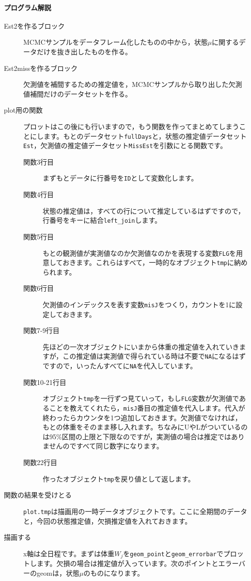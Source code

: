 \documentclass{ltjsbook}
\begin{document}
\paragraph{プログラム解説}
\begin{description}
	\item[Est2を作るブロック] MCMCサンプルをデータフレーム化したものの中から，状態$\mu$に関するデータだけを抜き出したものを作る。
	\item[Est2missを作るブロック] 欠測値を補間するための推定値を，MCMCサンプルから取り出した欠測値補間だけのデータセットを作る。
	\item[plot用の関数] プロットはこの後にも行いますので，もう関数を作ってまとめてしまうことにします。もとのデータセット\verb|fullDays|と，状態の推定値データセット\verb|Est|，欠測値の推定値データセット\verb|MissEst|を引数にとる関数です。
	      \begin{description}
		      \item[関数3行目] まずもとデータに行番号を\verb|ID|として変数化します。
		      \item[関数4行目] 状態の推定値は，すべての行について推定しているはずですので，行番号をキーに結合\verb|left_join|します。
		      \item[関数5行目] もとの観測値が実測値なのか欠測値なのかを表現する変数\verb|FLG|を用意しておきます。これらはすべて，一時的なオブジェクト\verb|tmp|に納められます。
		      \item[関数6行目] 欠測値のインデックスを表す変数\verb|misJ|をつくり，カウントを1に設定しておきます。
		      \item[関数7-9行目] 先ほどの一次オブジェクトにいまから体重の推定値を入れていきますが，この推定値は実測値で得られている時は不要で\verb|NA|になるはずですので，いったんすべてに\verb|NA|を代入しています。
		      \item[関数10-21行目] オブジェクト\verb|tmp|を一行ずつ見ていって，もし\verb|FLG|変数が欠測値であることを教えてくれたら，\verb|misJ|番目の推定値を代入します。代入が終わったらカウンタを1つ追加しておきます。欠測値でなければ，もとの体重をそのまま移し入れます。ちなみにUやLがついているのは95\%区間の上限と下限なのですが，実測値の場合は推定ではありませんのですべて同じ数字になります。
		      \item[関数22行目] 作ったオブジェクト\verb|tmp|を戻り値として返します。
	      \end{description}
	\item[関数の結果を受けとる] \verb|plot.tmp|は描画用の一時データオブジェクトです。ここに全期間のデータと，今回の状態推定値，欠損推定値を入れておきます。
	\item[描画する] x軸は全日程です。まずは体重$W_j$を\verb|geom_point|と\verb|geom_errorbar|でプロットします。欠損の場合は推定値が入っています。次のポイントとエラーバーのgeomは，状態$\mu$のものになります。
\end{description}
\end{document}
